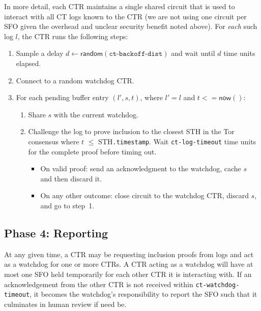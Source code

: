 In more detail, each CTR maintains a single shared circuit that is used to
interact with all CT logs known to the CTR (we are not using one circuit per
SFO given the overhead and unclear security benefit noted above). For
\emph{each} such log $l$, the CTR runs the following steps: %
\begin{enumerate}
    \item\label{enm:auditing:backoff} Sample a delay $d \gets
        \mathsf{random}(\texttt{ct-backoff-dist})$ and wait until $d$ time units
        elapsed.
    \item Connect to a random watchdog CTR\@.
    \item\label{enm:auditing:loop} For each pending buffer entry $(l',s,t)$,
    where $l' = l$ and $t <= \mathsf{now}()$:
		\begin{enumerate}
			\item\label{enm:ext:auditing:watchdog} Share $s$ with the current
				watchdog.
			\item\label{enm:ext:auditing:challenge} Challenge the log to prove
                                  inclusion to the closest STH in the Tor
								  consensus where $t$ $\leq$
								  STH\texttt{.timestamp}. Wait
								  \texttt{ct-log-timeout} time units for the
								  complete proof before timing out.
				\begin{itemize}
					\item\label{enm:ext:auditing:challenge:success} On valid
						proof: send an acknowledgment to the watchdog, cache $s$
						and then discard it.
					\item\label{enm:ext:auditing:challenge:fail} On any other
						outcome: close circuit to the watchdog CTR, discard $s$,
						and go to step~1.
				\end{itemize}
		\end{enumerate}
\end{enumerate}

\subsection{Phase 4: Reporting}

At any given time, a CTR may be requesting inclusion proofs from logs and act as
a watchdog for one or more CTRs. A CTR acting as a watchdog will have at
most one SFO held temporarily for each other CTR it is interacting with. If an
acknowledgement from the other CTR is not received within
\texttt{ct-watchdog-timeout}, it becomes the watchdog's responsibility to report
the SFO such that it culminates in human review if need be.

